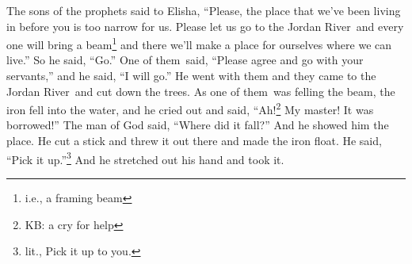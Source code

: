 
\begin{inparaenum}
     The sons of the prophets said to Elisha, ``Please, the place that we've been living in before you is too narrow for us.%
     Please let us go to the Jordan River\understood\ and every one will bring a beam\footnote{i.e., a framing beam} and there we'll make a place for ourselves where we can live.'' So he said, ``Go.''%
     One of them\understood\ said, ``Please agree and go with your servants,'' and he said, ``I will go.''%
     He went with them and they came to the Jordan River\understood\ and cut down the trees.%
     As one of them\understood\ was felling the beam, the iron fell into the water, and he cried out and said, ``Ah!\footnote{KB: a cry for help} My master! It was borrowed!''%
     The man of God said, ``Where did it fall?'' And he showed him the place. He cut a stick and threw it out there and made the iron float.%
     He said, ``Pick it up.''\footnote{lit., Pick it up to you.} And he stretched out his hand and took it.%
    

\end{inparaenum}
